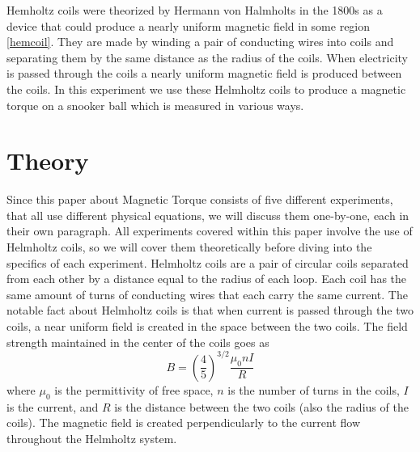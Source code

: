 \documentclass[aps,prl,10pt,twocolumn,floatfix]{revtex4-2}
\begin{document}
Hemholtz coils were theorized by Hermann von Halmholts in the 1800s as a device that could produce a nearly uniform magnetic field in some region \ref{hemcoil}. 
They are made by winding a pair of conducting wires into coils and separating them by the same distance as the radius of the coils.
When electricity is passed through the coils a nearly uniform magnetic field is produced between the coils. 
In this experiment we use these Helmholtz coils to produce a magnetic torque on a snooker ball which is measured in various ways. 


\section{Theory}\label{Theory}
Since this paper about Magnetic Torque consists of five different experiments, that all use different physical equations, we will discuss them one-by-one, each in their own paragraph. 
All experiments covered within this paper involve the use of Helmholtz coils, so we will cover them theoretically before diving into the specifics of each experiment. 
Helmholtz coils are a pair of circular coils separated from each other by a distance equal to the radius of each loop. 
Each coil has the same amount of turns of conducting wires that each carry the same current. 
The notable fact about Helmholtz coils is that when current is passed through the two coils, a near uniform field is created in the space between the two coils. 
The field strength maintained in the center of the coils goes as
\begin{equation}
    B=\left(\frac{4}{5}\right) ^{3/2}\frac{\mu_0nI}{R}
\end{equation}
where $\mu_0$ is the permittivity of free space, $n$ is the number of turns in the coils, $I$ is the current, and $R$ is the distance between the two coils (also the radius of the coils).
The magnetic field is created perpendicularly to the current flow throughout the Helmholtz system. 
\end{document}
